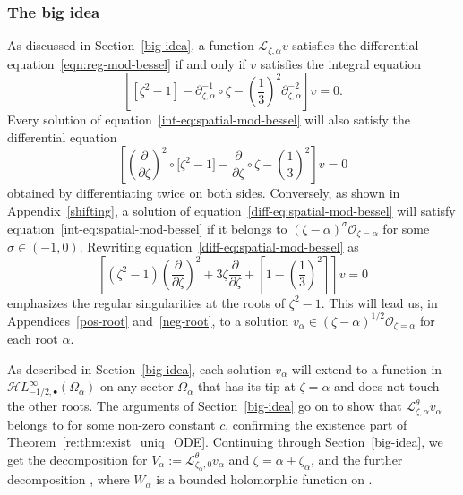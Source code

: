 \documentclass[pdftex]{sigma}
\newcommand{\singexp}[2]{\mathcal{H}L^\infty_{#1, #2}}
\newcommand{\singexpalg}[1]{\singexp{#1}{\bullet}}
\newcommand{\dualsingexp}[1]{\widehat{\mathcal{H}}L^\infty_{#1}}
\newcommand{\fracderiv}[3]{\partial^{#1}_{#2, #3}}
\newcommand{\laplace}{\mathcal{L}}
\numberwithin{equation}{section}
\begin{document}
\subsubsection{The big idea}\label{big-idea-airy}
As discussed in Section~\ref{big-idea}, a function $\laplace_{\zeta, \alpha} v$ satisfies the differential equation~\eqref{eqn:reg-mod-bessel} if and only if $v$ satisfies the integral equation
\begin{equation}\label{int-eq:spatial-mod-bessel}
\left[ \left[ \zeta^2 - 1 \right] - \fracderiv{-1}{\zeta}{\alpha} \circ \zeta - \left(\frac{1}{3}\right)^2 \fracderiv{-2}{\zeta}{\alpha} \right] v = 0.
\end{equation}
Every solution of equation~\eqref{int-eq:spatial-mod-bessel} will also satisfy the differential equation
\begin{equation}\label{diff-eq:spatial-mod-bessel}
\left[ \left(\frac{\partial}{\partial \zeta}\right)^2 \circ \bigl[ \zeta^2 - 1 \bigr] - \frac{\partial}{\partial \zeta} \circ \zeta - \left(\frac{1}{3}\right)^2 \right] v = 0
\end{equation}
obtained by differentiating twice on both sides. Conversely, as shown in Appendix~\ref{shifting}, a solution of equation~\eqref{diff-eq:spatial-mod-bessel} will satisfy equation~\eqref{int-eq:spatial-mod-bessel} if it belongs to $(\zeta - \alpha)^\sigma \mathcal{O}_{\zeta = \alpha}$ for some $\sigma \in (-1, 0)$. Rewriting equation~\eqref{diff-eq:spatial-mod-bessel} as
\[ \left[ (\zeta^2 - 1) \left(\frac{\partial}{\partial \zeta}\right)^2 + 3\zeta \frac{\partial}{\partial \zeta} + \left[ 1 - \left(\frac{1}{3}\right)^2 \right] \right] v = 0 \]
emphasizes the regular singularities at the roots of $\zeta^2 - 1$. This will lead us, in Appendices~\ref{pos-root} and~\ref{neg-root}, to a solution $v_\alpha \in (\zeta - \alpha)^{1/2} \mathcal{O}_{\zeta = \alpha}$ for each root $\alpha$.

As described in Section~\ref{big-idea}, each solution $v_\alpha$ will extend to a function in $\singexpalg{-1/2}(\Omega_\alpha)$ on any sector $\Omega_\alpha$ that has its tip at $\zeta = \alpha$ and does not touch the other roots. The arguments of Section~\ref{big-idea} go on to show that $\laplace^\theta_{\zeta, \alpha} v_\alpha$ belongs to
\smash{$ cz^{-\tau_\alpha} + \dualsingexp{-3/2}\bigl(\widehat{\Omega}_\alpha^\Lambda\bigr) $}
for some non-zero constant $c$, confirming the existence part of Theorem~\ref{re:thm:exist_uniq_ODE}. Continuing through Section~\ref{big-idea}, we get the decomposition
\smash{$ \laplace^\theta_{\zeta, \alpha} v_\alpha = {\rm e}^{-\alpha z} V_\alpha $}
for $V_\alpha := \laplace^\theta_{\zeta_\alpha, 0} v_\alpha$ and $\zeta = \alpha + \zeta_\alpha$, and the further decomposition
\smash{$\laplace_{\zeta, \alpha} v_\alpha = {\rm e}^{-\alpha z} z^{-1/2} W_\alpha$},
where $W_\alpha$ is a bounded holomorphic function on \smash{$\widehat{\Omega}_\alpha^\Lambda$}.
\end{document}
